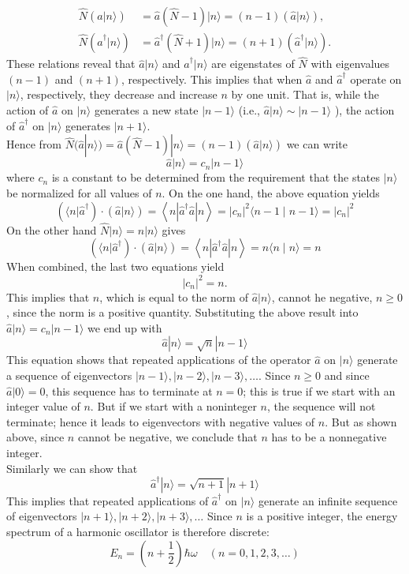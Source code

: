 $$\begin{aligned}
	\hat{N}(\hat{a}|n\rangle) &=\hat{a}(\hat{N}-1)|n\rangle=(n-1)(\hat{a}|n\rangle), \\
	\hat{N}\left(\hat{a}^{\dagger}|n\rangle\right) &=\hat{a}^{\dagger}(\hat{N}+1)|n\rangle=(n+1)\left(\hat{a}^{\dagger}|n\rangle\right) .
\end{aligned}$$
These relations reveal that $\hat{a}|n\rangle$ and $\hat{a}^{\dagger}|n\rangle$ are eigenstates of $\hat{N}$ with eigenvalues $(n-1)$ and $(n+1)$, respectively. This implies that when $\hat{a}$ and $\hat{a}^{\dagger}$ operate on $|n\rangle$, respectively, they decrease and increase $n$ by one unit. That is, while the action of $\hat{a}$ on $|n\rangle$ generates a new state $|n-1\rangle$ (i.e., $\hat{a}|n\rangle \sim|n-1\rangle$ ), the action of $\hat{a}^{\dagger}$ on $|n\rangle$ generates $|n+1\rangle$.\\
 Hence from $\hat{N}(\hat{a}|n\rangle) =\hat{a}(\hat{N}-1)|n\rangle=(n-1)(\hat{a}|n\rangle)$ we can write
 $$\hat{a}|n\rangle=c_{n}|n-1\rangle$$
 where $c_{n}$ is a constant to be determined from the requirement that the states $|n\rangle$ be normalized for all values of $n$. On the one hand, the above equation  yields
 $$\left(\langle n| \hat{a}^{\dagger}\right) \cdot(\hat{a}|n\rangle)=\left\langle n\left|\hat{a}^{\dagger} \hat{a}\right| n\right\rangle=\left|c_{n}\right|^{2}\langle n-1 \mid n-1\rangle=\left|c_{n}\right|^{2}$$
 On the other hand $\hat{N}|n\rangle=n|n\rangle $ gives
 $$\left(\langle n| \hat{a}^{\dagger}\right) \cdot(\hat{a}|n\rangle)=\left\langle n\left|\hat{a}^{\dagger} \hat{a}\right| n\right\rangle=n\langle n \mid n\rangle=n $$
 When combined, the last two equations yield
 $$
 \left|c_{n}\right|^{2}=n .
 $$
 This implies that $n$, which is equal to the norm of $\hat{a}|n\rangle$, cannot he negative, $n \geq 0$, since the norm is a positive quantity. Substituting the above result  into $\hat{a}|n\rangle=c_{n}|n-1\rangle$  we end up with
 $$\hat{a}|n\rangle=\sqrt{n}|n-1\rangle$$
 This equation shows that repeated applications of the operator $\hat{a}$ on $|n\rangle$ generate a sequence of eigenvectors $|n-1\rangle,|n-2\rangle,|n-3\rangle, \ldots$. Since $n \geq 0$ and since $\hat{a}|0\rangle=0$, this sequence has to terminate at $n=0$; this is true if we start with an integer value of $n$. But if we start with a noninteger $n$, the sequence will not terminate; hence it leads to eigenvectors with negative values of $n$. But as shown above, since $n$ cannot be negative, we conclude that $n$ has to be a nonnegative integer.\\
 Similarly we can show that \\
 $$\hat{a}^{\dagger}|n\rangle=\sqrt{n+1}|n+1\rangle$$
 This implies that repeated applications of $\hat{a}^{\dagger}$ on $|n\rangle$ generate an infinite sequence of eigenvectors $|n+1\rangle,|n+2\rangle,|n+3\rangle, \ldots$ Since $n$ is a positive integer, the energy spectrum of a harmonic oscillator  is therefore discrete:
$$ E_{n}=\left(n+\frac{1}{2}\right) \hbar \omega \quad(n=0,1,2,3, \ldots)$$
